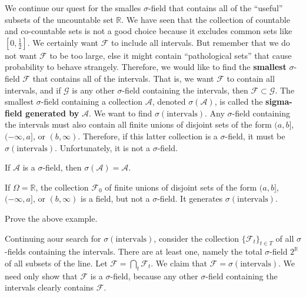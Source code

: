 \documentclass[
  b5paper,
]{scrbook}
\theoremstyle{definition}
\theoremstyle{definition}
\theoremstyle{definition}
\theoremstyle{remark}
\let\BeginKnitrBlock\begin \let\EndKnitrBlock\end
\begin{document}
We continue our quest for the smalles \(\sigma\)-field that contains all of the ``useful'' subsets of the uncountable set \(\mathbb{R}\). We have seen that the collection of countable and co-countable sets is not a good choice because it excludes common sets like \([0,\frac{1}{2}]\). We certainly want \(\mathcal{F}\) to include all intervals. But remember that we do not want \(\mathcal{F}\) to be too large, else it might contain ``pathological sets'' that cause probability to behave strangely. Therefore, we would like to find the \textbf{smallest} \(\sigma\)-field \(\mathcal{F}\) that contains all of the intervals. That is, we want \(\mathcal{F}\) to contain all intervals, and if \(\mathcal{G}\) is any other \(\sigma\)-field containing the intervals, then \(\mathcal{F}\subset\mathcal{G}\). The smallest \(\sigma\)-field containing a collection \(\mathcal{A}\), denoted \(\sigma(\mathcal{A})\), is called the \textbf{sigma-field generated by} \(\mathcal{A}\). We want to find \(\sigma(\text{intervals})\). Any \(\sigma\)-field containing the intervals must also contain all finite unions of disjoint sets of the form \((a,b]\), \((-\infty, a]\), or \((b,\infty)\). Therefore, if this latter collection is a \(\sigma\)-field, it must be \(\sigma(\text{intervals})\). Unfortunately, it is not a \(\sigma\)-field.

\BeginKnitrBlock{exercise}
\protect\hypertarget{exr:unnamed-chunk-27}{}{\label{exr:unnamed-chunk-27} }If \(\mathcal{A}\) is a \(\sigma\)-field, then \(\sigma(\mathcal{A})=\mathcal{A}\).
\EndKnitrBlock{exercise}

\BeginKnitrBlock{example}[Very important field]
\protect\hypertarget{exm:unnamed-chunk-28}{}{\label{exm:unnamed-chunk-28} {} }If \(\Omega =\mathbb{R}\), the collection \(\mathcal{F}_{0}\) of finite unions of disjoint sets of the form \((a,b]\), \((-\infty,a]\), or \((b,\infty)\) is a field, but not a \(\sigma\)-field. It generates \(\sigma(\text{intervals})\).
\EndKnitrBlock{example}

\BeginKnitrBlock{exercise}
\protect\hypertarget{exr:unnamed-chunk-29}{}{\label{exr:unnamed-chunk-29} }Prove the above example.
\EndKnitrBlock{exercise}

Continuing aour search for \(\sigma(\text{intervals})\), consider the collection \(\{\mathcal{F}_{t}\}_{t\in T}\) of all \(\sigma\)-fields containing the intervals. There are at least one, namely the total \(\sigma\)-field \(2^{\mathbb{R}}\) of all subsets of the line. Let \(\mathcal{F} = \bigcap_{t}\mathcal{F}_{t}\). We claim that \(\mathcal{F}=\sigma(\text{intervals})\). We need only show that \(\mathcal{F}\) is a \(\sigma\)-field, because any other \(\sigma\)-field containing the intervals clearly contains \(\mathcal{F}\).
\end{document}

